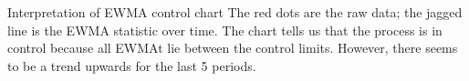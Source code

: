 \documentclass[Charts101.tex]{subfiles}
\begin{document}
\begin{frame}
Interpretation of EWMA control chart	The red dots are the raw data; the jagged line is the EWMA statistic over time. The chart tells us that the process is in control because all EWMAt lie between the control limits. However, there seems to be a trend upwards for the last 5 periods.
\end{frame}
\end{document}
